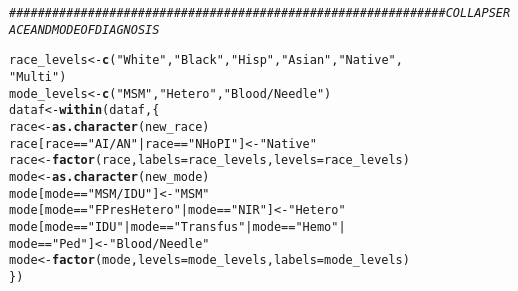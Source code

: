 \documentclass{article}\usepackage[]{graphicx}\usepackage[]{color}
\makeatletter
\newcommand{\hlstr}[1]{\textcolor[rgb]{0.192,0.494,0.8}{#1}}%
\newcommand{\hlcom}[1]{\textcolor[rgb]{0.678,0.584,0.686}{\textit{#1}}}%
\newcommand{\hlopt}[1]{\textcolor[rgb]{0,0,0}{#1}}%
\newcommand{\hlstd}[1]{\textcolor[rgb]{0.345,0.345,0.345}{#1}}%
\newcommand{\hlkwb}[1]{\textcolor[rgb]{0.69,0.353,0.396}{#1}}%
\newcommand{\hlkwc}[1]{\textcolor[rgb]{0.333,0.667,0.333}{#1}}%
\newcommand{\hlkwd}[1]{\textcolor[rgb]{0.737,0.353,0.396}{\textbf{#1}}}%
\newenvironment{kframe}{%
 \def\at@end@of@kframe{}%
 \ifinner\ifhmode%
  \def\at@end@of@kframe{\end{minipage}}%
  \begin{minipage}{\columnwidth}%
 \fi\fi%
 \def\FrameCommand##1{\hskip\@totalleftmargin \hskip-\fboxsep
 \colorbox{shadecolor}{##1}\hskip-\fboxsep
     \hskip-\linewidth \hskip-\@totalleftmargin \hskip\columnwidth}%
 \MakeFramed {\advance\hsize-\width
   \@totalleftmargin\z@ \linewidth\hsize
   \@setminipage}}%
 {\par\unskip\endMakeFramed%
 \at@end@of@kframe}
\newenvironment{knitrout}{}{} %
\makeatother
\begin{document}
\begin{knitrout}
\color{fgcolor}\begin{kframe}
\begin{alltt}
\hlcom{############################################################# COLLAPSE RACE AND MODE OF DIAGNOSIS}

\hlstd{race_levels} \hlkwb{<-} \hlkwd{c}\hlstd{(}\hlstr{"White"}\hlstd{,} \hlstr{"Black"}\hlstd{,} \hlstr{"Hisp"}\hlstd{,} \hlstr{"Asian"}\hlstd{,} \hlstr{"Native"}\hlstd{,}
    \hlstr{"Multi"}\hlstd{)}
\hlstd{mode_levels} \hlkwb{<-} \hlkwd{c}\hlstd{(}\hlstr{"MSM"}\hlstd{,} \hlstr{"Hetero"}\hlstd{,} \hlstr{"Blood/Needle"}\hlstd{)}
\hlstd{dataf} \hlkwb{<-} \hlkwd{within}\hlstd{(dataf, \{}
    \hlstd{race} \hlkwb{<-} \hlkwd{as.character}\hlstd{(new_race)}
    \hlstd{race[race} \hlopt{==} \hlstr{"AI/AN"} \hlopt{|} \hlstd{race} \hlopt{==} \hlstr{"NHoPI"}\hlstd{]} \hlkwb{<-} \hlstr{"Native"}
    \hlstd{race} \hlkwb{<-} \hlkwd{factor}\hlstd{(race,} \hlkwc{labels} \hlstd{= race_levels,} \hlkwc{levels} \hlstd{= race_levels)}
    \hlstd{mode} \hlkwb{<-} \hlkwd{as.character}\hlstd{(new_mode)}
    \hlstd{mode[mode} \hlopt{==} \hlstr{"MSM/IDU"}\hlstd{]} \hlkwb{<-} \hlstr{"MSM"}
    \hlstd{mode[mode} \hlopt{==} \hlstr{"F Pres Hetero"} \hlopt{|} \hlstd{mode} \hlopt{==} \hlstr{"NIR"}\hlstd{]} \hlkwb{<-} \hlstr{"Hetero"}
    \hlstd{mode[mode} \hlopt{==} \hlstr{"IDU"} \hlopt{|} \hlstd{mode} \hlopt{==} \hlstr{"Transfus"} \hlopt{|} \hlstd{mode} \hlopt{==} \hlstr{"Hemo"} \hlopt{|}
        \hlstd{mode} \hlopt{==} \hlstr{"Ped"}\hlstd{]} \hlkwb{<-} \hlstr{"Blood/Needle"}
    \hlstd{mode} \hlkwb{<-} \hlkwd{factor}\hlstd{(mode,} \hlkwc{levels} \hlstd{= mode_levels,} \hlkwc{labels} \hlstd{= mode_levels)}
\hlstd{\})}
\end{alltt}
\end{kframe}
\end{knitrout}
\end{document}
